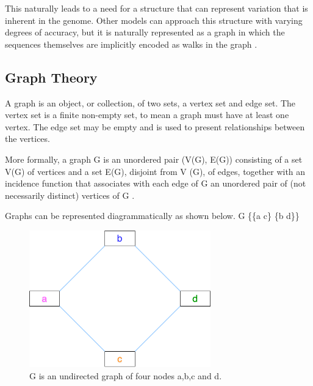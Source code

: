 \documentclass[10pt, a4paper]{article}
\begin{document}
This naturally leads to a need for a structure that can represent variation that
is inherent in the genome. Other models can approach this structure with
varying degrees of accuracy, but it is naturally represented as a graph in
which the sequences themselves are implicitly encoded as walks in the graph
\cite{patenGenomeGraphsEvolution2017}.
\subsection{Graph Theory}
\label{sec:orgc17e0c9}
A graph is an object, or collection, of two sets, a vertex set and edge set.
The vertex set is a finite non-empty set, to mean a graph must have at least one
vertex.
The edge set may be empty \cite{trudeauIntroductionGraphTheory1993}
and is used to present relationships between the vertices.

More formally, a graph G is an unordered pair (V(G), E(G)) consisting of a set
V(G) of vertices and a set E(G), disjoint from V (G), of edges, together with
an incidence function that associates with each edge of G an unordered pair of
(not necessarily distinct) vertices of G \cite{bondyGraphTheory2011}.

Graphs can be represented diagrammatically as shown below.
G \{\{a c\} \{b d\}\}
\begin{figure}
\centering
\includegraphics[width=0.7\textwidth]{figures/Graph-classifications-Undirected.png}
\caption{\label{fig:org87c9a7e}
G is an undirected graph of four nodes a,b,c and d.}
\end{figure}
\end{document}
